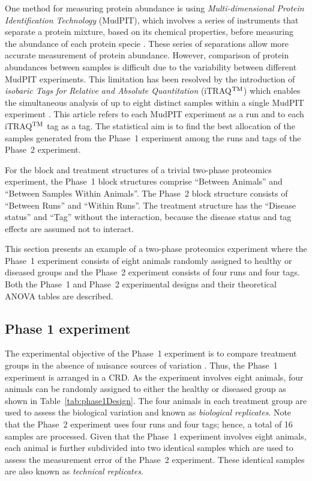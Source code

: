 \documentclass[article]{jss}
\begin{document}
One method for measuring protein abundance is using \emph{Multi-dimensional Protein Identification Technology} (MudPIT), which involves a series of instruments that separate a protein mixture, based on its chemical properties, before measuring the abundance of each protein specie \citep{Florens2006a}. These series of separations allow more accurate measurement of protein abundance. However, comparison of protein abundances between samples is difficult due to the variability between different MudPIT experiments. This limitation has been resolved by the introduction of \emph{isobaric Tags for Relative and Absolute Quantitation} (iTRAQ$^{\rm TM}$) which enables the simultaneous analysis of up to eight distinct samples within a single MudPIT experiment \citep{Ross2004, Choe2007}. This article refers to each MudPIT experiment as a run and to each iTRAQ$^{\rm TM}$ tag as a tag. The statistical aim is to find the best allocation of the samples generated from the Phase~1 experiment among the runs and tags of the Phase~2 experiment.

For the block and treatment structures of a trivial two-phase proteomics experiment, the Phase~1 block structures comprise ``Between Animals'' and ``Between Samples Within Animals''. The Phase~2 block structure consists of ``Between Runs'' and ``Within Runs''. The treatment structure has the ``Disease status'' and ``Tag'' without the interaction, because the disease status and tag effects are assumed not to interact.

This section presents an example of a two-phase proteomics experiment where the Phase~1 experiment consists of eight animals randomly assigned to healthy or diseased groups and the Phase~2 experiment consists of four runs and four tags. Both the Phase~1 and Phase~2 experimental designs and their theoretical ANOVA tables are described.

\subsection{Phase 1 experiment}
\label{subsec:Phase1Exp}
The experimental objective of the Phase~1 experiment is to compare treatment groups in the absence of nuisance sources of variation \citep{Mead1988}. Thus, the Phase~1 experiment is arranged in a CRD. As the experiment involves eight animals, four animals can be randomly assigned to either the healthy or diseased group as shown in Table~\ref{tab:phase1Design}. The four animals in each treatment group are used to assess the biological variation and known as \emph{biological replicates}. Note that the Phase~2 experiment uses four runs and four tags; hence, a total of 16 samples are processed. Given that the Phase~1 experiment involves eight animals, each animal is further subdivided into two identical samples which are used to assess the measurement error of the Phase~2 experiment. These identical samples are also known as \emph{technical replicates}.
\end{document}
